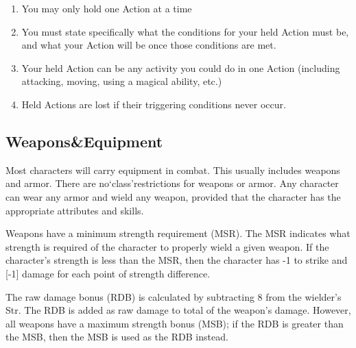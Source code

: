 \documentclass[twoside]{book}
\begin{document}
\begin{enumerate}
      
  \item 
    {  
    You may only hold one Action at a time
    }
  
  \item 
    {  
    You must state specifically what the conditions for your held Action must be, and what your Action will be once those conditions are met.
    }
  
  \item 
    {  
    Your held Action can be any activity you could do in one Action (including attacking, moving, using a magical ability, etc.)
    }
  
  \item 
    {  
    Held Actions are lost if their triggering conditions never occur.
    }
  
\end{enumerate}
  
    

\subsection{Weapons\&Equipment}
    
    {  
    Most characters will carry equipment in combat. This usually includes weapons and armor. There are no`class'restrictions for weapons or armor. Any character can wear any armor and wield any weapon, provided that the character has the appropriate attributes and skills.
    }
  
    {  
    Weapons have a minimum strength requirement (MSR). The MSR indicates what strength is required of the character to properly wield a given weapon. If the character's strength is less than the MSR, then the character has -1 to strike and [-1] damage for each point of strength difference.
    }
  
    {  
    The raw damage bonus (RDB) is calculated by subtracting 8 from the wielder's Str. The RDB is added as raw damage to total of the weapon's damage. However, all weapons have a maximum strength bonus (MSB); if the RDB is greater than the MSB, then the MSB is used as the RDB instead.
    }
  
  

  
\end{document}

